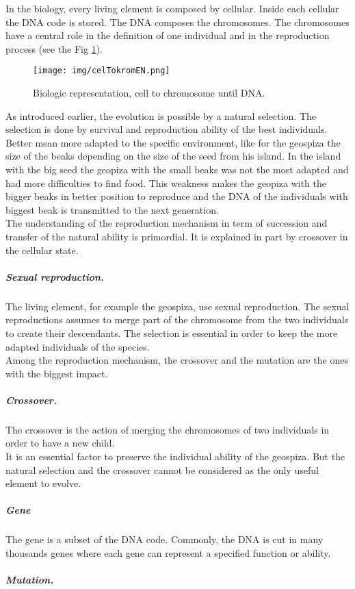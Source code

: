 In the biology, every living element is composed by cellular. Inside each cellular the DNA code is stored. The DNA composes the chromosomes. The chromosomes have a central role in the definition of one individual and in the reproduction process (see the Fig \ref{fig:celTokrom}). \\
\begin{figure}[t!]
\center
{}
   \texttt{[image: img/celTokromEN.png]}
  \caption{Biologic representation, cell to chromosome until DNA.}\label{fig:celTokrom}
  \endminipage\hfill
\end{figure}
As introduced earlier, the evolution is possible by a natural selection. The selection is done by survival and reproduction ability of the best individuals. Better mean more adapted to the specific environment, like for the geospiza the size of the beaks depending on the size of the seed from his island.
In the island with the big seed  the geopiza with the small beaks was not the most adapted and had more difficulties to find food. This weakness makes the geopiza with the bigger beaks in better position to reproduce and
 the DNA of the individuals with biggest beak is transmitted to the next generation.\\
 The understanding of the reproduction mechanism in term of succession and transfer of the natural ability is primordial. It is explained in part by crossover in the cellular state.
 \subparagraph{Sexual reproduction. }
The living element, for example the geospiza, use sexual reproduction. The sexual reproductions assumes to merge  part of the chromosome from the two individuals to create their descendants. The selection is essential in order to keep the more adapted individuals of the species. \\ 
Among the reproduction mechanism, the crossover and the mutation are the ones with the biggest impact.
\subparagraph{Crossover. }
The crossover is the action of merging the chromosomes of two individuals in order to have a new child.\\
It is an essential factor to preserve the individual ability of the geospiza. But the natural selection and the crossover cannot be considered as the only useful element to evolve. 
\subparagraph{Gene}
The gene is a subset of the DNA code. Commonly, the DNA is cut in many thousands genes where each gene can represent a specified function or ability.  
\subparagraph{Mutation. }
